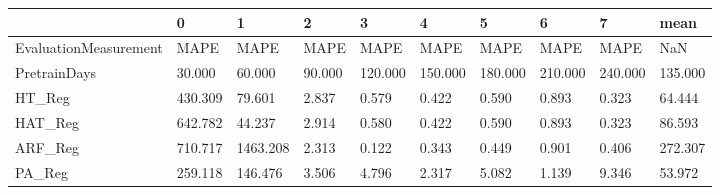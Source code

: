 \begin{tabular}{llllllllll}
\toprule
{} &       0 &        1 &      2 &       3 &       4 &       5 &       6 &       7 &    mean \\
\midrule
EvaluationMeasurement &    MAPE &     MAPE &   MAPE &    MAPE &    MAPE &    MAPE &    MAPE &    MAPE &     NaN \\
PretrainDays          &  30.000 &   60.000 & 90.000 & 120.000 & 150.000 & 180.000 & 210.000 & 240.000 & 135.000 \\
HT\_Reg                & 430.309 &   79.601 &  2.837 &   0.579 &   0.422 &   0.590 &   0.893 &   0.323 &  64.444 \\
HAT\_Reg               & 642.782 &   44.237 &  2.914 &   0.580 &   0.422 &   0.590 &   0.893 &   0.323 &  86.593 \\
ARF\_Reg               & 710.717 & 1463.208 &  2.313 &   0.122 &   0.343 &   0.449 &   0.901 &   0.406 & 272.307 \\
PA\_Reg                & 259.118 &  146.476 &  3.506 &   4.796 &   2.317 &   5.082 &   1.139 &   9.346 &  53.972 \\
\bottomrule
\end{tabular}
